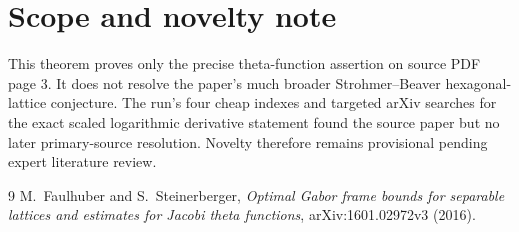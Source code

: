 \documentclass[11pt,a4paper]{article}
\begin{document}
\section*{Scope and novelty note}
This theorem proves only the precise theta-function assertion on source PDF
page 3.  It does not resolve the paper's much broader Strohmer--Beaver
hexagonal-lattice conjecture.  The run's four cheap indexes and targeted arXiv
searches for the exact scaled logarithmic derivative statement found the
source paper but no later primary-source resolution.  Novelty therefore
remains provisional pending expert literature review.

\begin{thebibliography}{9}
M.~Faulhuber and S.~Steinerberger,
\emph{Optimal Gabor frame bounds for separable lattices and estimates for
Jacobi theta functions}, arXiv:1601.02972v3 (2016).
\end{thebibliography}
\end{document}
